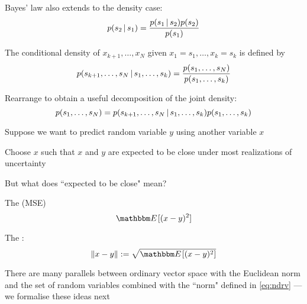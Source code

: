 \begin{frame}

    \vspace{2em}
    Bayes' law also extends to the
    density case:
    \begin{equation*}
        \label{eq:brdc}
        p(s_2 \, | \, s_1) = \frac{p(s_1 \, | \, s_2) p(s_2)}{p(s_1)}
    \end{equation*}

\end{frame}

\begin{frame}

    \vspace{2em}
    The conditional density of $x_{k+1},\ldots, x_N$ given $x_1 = s_1,\ldots, x_k =
    s_k$ is defined by
    \begin{equation*}
        \label{eq:condden}
        p(s_{k+1},\ldots,s_N \, | \, s_1,\ldots,s_k) 
            = \frac{p(s_1,\ldots,s_N)}{p(s_1,\ldots,s_k)}
    \end{equation*}
    
    \vspace{1em}
    Rearrange to obtain a useful decomposition of the joint
    density:
    \begin{equation*}
        \label{eq:decompjd}
        p(s_1,\ldots,s_N) 
        = p(s_{k+1},\ldots,s_N \, | \, s_1,\ldots,s_k) p(s_1,\ldots,s_k)
    \end{equation*}
    
\end{frame}

\begin{frame}

    \vspace{2em}
    Suppose we want to predict random variable $y$ using another variable $x$
    
    Choose $x$ such that $x$ and $y$ are expected to be close
    under most realizations of uncertainty
    
    \vspace{1em}
    But what does ``expected to be close" mean?
    
\end{frame}

\begin{frame}

    \vspace{2em}
    The  (MSE)
    $$\EE [ (x -
    y)^2 ]$$
    
    The :
    \begin{equation}
        \label{eq:ndrv}
        \| x - y \| := \sqrt{ \EE [ (x - y)^2 ] }
    \end{equation}
    
    There are many parallels between ordinary
    vector space with the Euclidean norm and the set of random variables  combined
    with the ``norm" defined in \eqref{eq:ndrv} --- we formalise these ideas next 
    
\end{frame}

